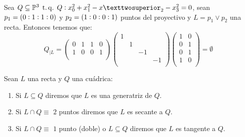 \begin{example}
  Sea $Q\subseteq \Po^3 \tq Q:x^2_0 +x^2_1 -x²_2-x^2_3=0$, sean $p_1=\left( 0:1:1:0\right)$ y $p_2=\left( 
  1:0:0:1\right)$ puntos del proyectivo y $L=p_1 \vee p_2$ una recta. Entonces tenemos que:
  \[
    Q_{|L}=
    \begin{pmatrix}
      0 & 1 & 1 & 0\\
      1 & 0 & 0 & 1\\
    \end{pmatrix}
    \begin{pmatrix}
      1 & & &\\
      & 1 & &\\
      & & -1 &\\
      & & & -1\\
    \end{pmatrix}
    \begin{pmatrix}
      1 & 0\\
      0 & 1\\
      0 & 1\\
      1 & 0\\
    \end{pmatrix}
    =\emptyset
  \]
  \label{exampleLinQ}
\end{example}

\begin{defi}
  Sean $L$ una recta y $Q$ una cuádrica:
  \begin{enumerate}[(1)]
    \item Si $L\subseteq Q$ diremos que $L$ es una generatriz de $Q$.
    \item Si $L\cap Q \equiv$ $2$ puntos diremos que $L$ es secante a $Q$.
    \item Si $L\cap Q \equiv$ $1$ punto (doble) o $L \subseteq Q$
    diremos que $L$ es tangente a $Q$.
  \end{enumerate}
\end{defi}

